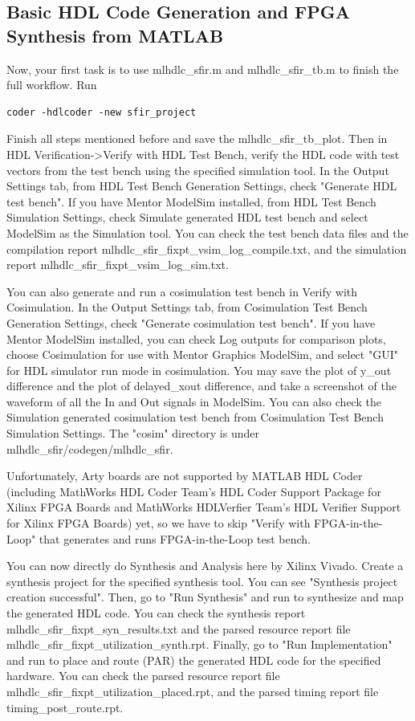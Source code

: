 \documentclass[a4paper,12pt,twoside]{article}
\begin{document}
\subsection{Basic HDL Code Generation and FPGA Synthesis from MATLAB}
Now, your first task is to use mlhdlc\_sfir.m and mlhdlc\_sfir\_tb.m to finish the full workflow. Run
\begin{verbatim}
coder -hdlcoder -new sfir_project
\end{verbatim}
Finish all steps mentioned before and save the mlhdlc\_sfir\_tb\_plot. Then in HDL Verification->Verify with HDL Test Bench, verify the HDL code with test vectors from the test bench using the specified simulation tool. In the Output Settings tab, from HDL Test Bench Generation Settings, check "Generate HDL test bench". If you have Mentor ModelSim installed, from HDL Test Bench Simulation Settings, check Simulate generated HDL test bench and select ModelSim as the Simulation tool. You can check the test bench data files and the compilation report mlhdlc\_sfir\_fixpt\_vsim\_log\_compile.txt, and the simulation report mlhdlc\_sfir\_fixpt\_vsim\_log\_sim.txt.

You can also generate and run a cosimulation test bench in Verify with Cosimulation. In the Output Settings tab, from Cosimulation Test Bench Generation Settings, check "Generate cosimulation test bench". If you have Mentor ModelSim installed, you can check Log outputs for comparison plots, choose Cosimulation for use with Mentor Graphics ModelSim, and select "GUI" for HDL simulator run mode in cosimulation. You may save the plot of y\_out difference and the plot of delayed\_xout difference, and take a screenshot of the waveform of all the In and Out signals in ModelSim. You can also check the Simulation generated cosimulation test bench from Cosimulation Test Bench Simulation Settings. The "cosim" directory is under mlhdlc\_sfir/codegen/mlhdlc\_sfir.

Unfortunately, Arty boards are not supported by MATLAB HDL Coder (including MathWorks HDL Coder Team's HDL Coder Support Package for Xilinx FPGA Boards and MathWorks HDLVerfier Team's HDL Verifier Support for Xilinx FPGA Boards) yet, so we have to skip "Verify with FPGA-in-the-Loop" that generates and runs FPGA-in-the-Loop test bench.

You can now directly do Synthesis and Analysis here by Xilinx Vivado. Create a synthesis project for the specified synthesis tool. You can see "Synthesis project creation successful". Then, go to "Run Synthesis" and run to synthesize and map the generated HDL code. You can check the synthesis report mlhdlc\_sfir\_fixpt\_syn\_results.txt and the parsed resource report file mlhdlc\_sfir\_fixpt\_utilization\_synth.rpt. Finally, go to "Run Implementation" and run to place and route (PAR) the generated HDL code for the specified hardware. You can check the parsed resource report file mlhdlc\_sfir\_fixpt\_utilization\_placed.rpt, and the parsed timing report file\\
timing\_post\_route.rpt.
\end{document}
